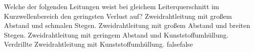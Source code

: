     {Welche der folgenden Leitungen weist bei gleichem Leiterquerschnitt im Kurzwellenbereich den geringsten Verlust auf?}
    {Zweidrahtleitung mit großem Abstand und schmalen Stegen.}
    {Zweidrahtleitung mit großem Abstand und breiten Stegen.}
    {Zweidrahtleitung mit geringem Abstand und Kunststoffumhüllung.}
    {Verdrillte Zweidrahtleitung mit Kunststoffumhüllung.}
    {false}{false}